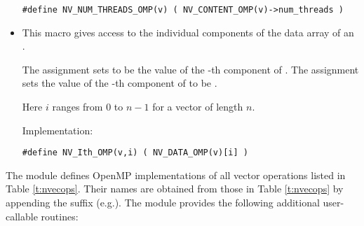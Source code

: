 \begin{itemize}
  \verb|#define NV_NUM_THREADS_OMP(v) ( NV_CONTENT_OMP(v)->num_threads )|

\item {}                                               
                                                            
  This macro gives access to the individual components of the data
  array of an .

  The assignment  sets  to be the value of 
  the -th component of . The assignment    
  sets the value of the -th component of  to be .        
  
  Here $i$ ranges from $0$ to $n-1$ for a vector of length $n$.

  Implementation:

  \verb|#define NV_Ith_OMP(v,i) ( NV_DATA_OMP(v)[i] )|

\end{itemize}
The {\nvecopenmp} module defines OpenMP implementations of all vector operations listed
in Table \ref{t:nvecops}. Their names are obtained from those in Table \ref{t:nvecops}
by appending the suffix  (e.g.).
The module {\nvecopenmp} provides the following additional user-callable routines:
